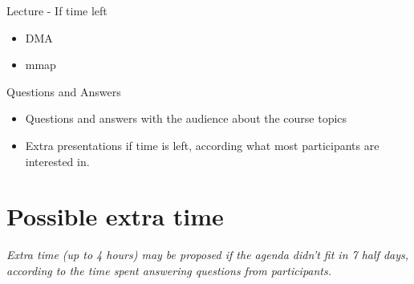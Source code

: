 \documentclass[a4paper,12pt,obeyspaces,spaces,hyphens]{article}
\begin{document}
\feagendatwocolumn
{Lecture - If time left}
{
  \begin{itemize}
  \item DMA
  \item mmap
  \end{itemize}
}
{Questions and Answers}
{
  \begin{itemize}
  \item Questions and answers with the audience about the course topics
  \item Extra presentations if time is left, according what most
        participants are interested in.
  \end{itemize}
}

\section{Possible extra time}

{\em Extra time (up to 4 hours) may be proposed if the agenda didn't fit in 7 half days,
     according to the time spent answering questions from participants.}
\end{document}
